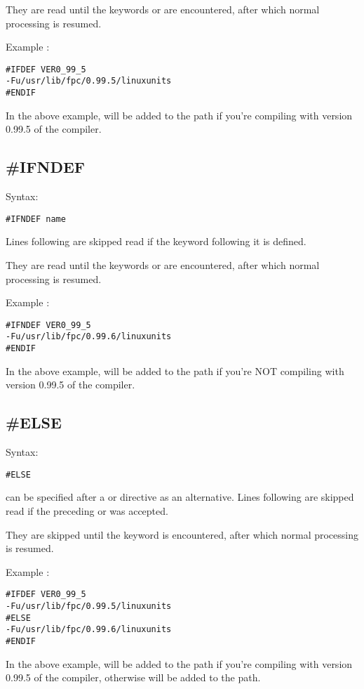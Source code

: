 They are read until the keywords  or  are
encountered, after which normal processing is resumed.

Example :
\begin{verbatim}
#IFDEF VER0_99_5
-Fu/usr/lib/fpc/0.99.5/linuxunits
#ENDIF
\end{verbatim}
In the above example,  will be added to
the path if you're compiling with version 0.99.5 of the compiler.

\subsection{\#IFNDEF}
Syntax:
\begin{verbatim}
#IFNDEF name
\end{verbatim}
Lines following  are skipped read if the keyword 
following it is defined.

They are read until the keywords  or  are
encountered, after which normal processing is resumed.

Example :
\begin{verbatim}
#IFNDEF VER0_99_5
-Fu/usr/lib/fpc/0.99.6/linuxunits
#ENDIF
\end{verbatim}
In the above example,  will be added to
the path if you're NOT compiling with version 0.99.5 of the compiler.

\subsection{\#ELSE}
Syntax:
\begin{verbatim}
#ELSE
\end{verbatim}
 can be specified after a  or 
directive as an alternative.
Lines following  are skipped read if the preceding 
or  was accepted.

They are skipped until the keyword  is
encountered, after which normal processing is resumed.

Example :
\begin{verbatim}
#IFDEF VER0_99_5
-Fu/usr/lib/fpc/0.99.5/linuxunits
#ELSE
-Fu/usr/lib/fpc/0.99.6/linuxunits
#ENDIF
\end{verbatim}
In the above example,  will be added to
the path if you're compiling with version 0.99.5 of the compiler,
otherwise  will be added to the path.


